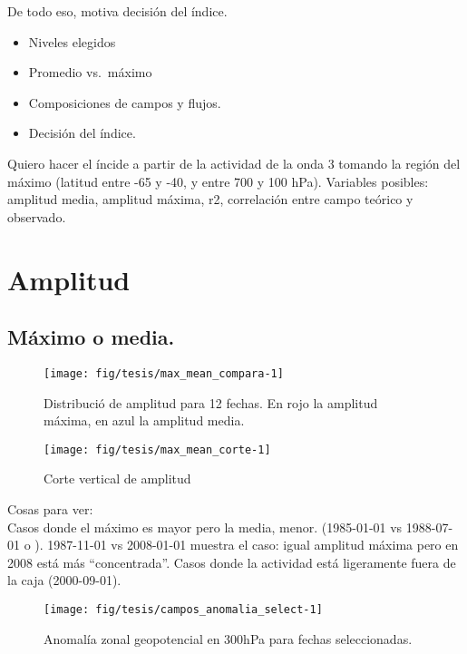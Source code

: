 \documentclass[spanish,a4paper]{book}
\providecommand{\tightlist}{%
  \setlength{\itemsep}{0pt}\setlength{\parskip}{0pt}}
\begin{document}
De todo eso, motiva decisión del índice.

\begin{itemize}
\tightlist
\item
  Niveles elegidos
\item
  Promedio vs.~máximo
\item
  Composiciones de campos y flujos.
\item
  Decisión del índice.
\end{itemize}

Quiero hacer el íncide a partir de la actividad de la onda 3 tomando la
región del máximo (latitud entre -65 y -40, y entre 700 y 100 hPa).
Variables posibles: amplitud media, amplitud máxima, r2, correlación
entre campo teórico y observado.

\section{Amplitud}\label{amplitud}

\subsection{Máximo o media.}\label{maximo-o-media.}

\begin{figure*}
\texttt{[image: fig/tesis/max\_mean\_compara-1]} \caption{Distribució de amplitud para 12 fechas. En rojo la amplitud máxima, en azul la amplitud media.}\label{fig:max_mean_compara}
\end{figure*}

\begin{figure*}
\texttt{[image: fig/tesis/max\_mean\_corte-1]} \caption{Corte vertical de amplitud}\label{fig:max_mean_corte}
\end{figure*}

Cosas para ver:\\
Casos donde el máximo es mayor pero la media, menor. (1985-01-01 vs
1988-07-01 o ). 1987-11-01 vs 2008-01-01 muestra el caso: igual amplitud
máxima pero en 2008 está más ``concentrada''. Casos donde la actividad
está ligeramente fuera de la caja (2000-09-01).

\begin{figure*}
\texttt{[image: fig/tesis/campos\_anomalia\_select-1]} \caption{Anomalía zonal geopotencial en 300hPa para fechas seleccionadas.}\label{fig:campos_anomalia_select}
\end{figure*}
\end{document}
